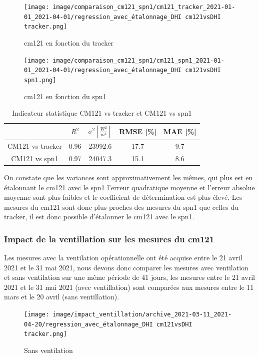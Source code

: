 \documentclass[12pt,a4paper]{article}
\begin{document}
\begin{flushleft}
\begin{figure}[H]
\centering
\texttt{[image: image/comparaison\_cm121\_spn1/cm121\_tracker\_2021-01-01\_2021-04-01/regression\_avec\_étalonnage\_DHI cm121vsDHI tracker.png]} 
\caption{cm121 en fonction du tracker}  
\end{figure}

\begin{figure}[H]
\centering
\texttt{[image: image/comparaison\_cm121\_spn1/cm121\_spn1\_2021-01-01\_2021-04-01/regression\_avec\_étalonnage\_DHI cm121vsDHI spn1.png]}  
\caption{cm121 en fonction du spn1}  
\end{figure}

\begin{table}[H]
\begin{center}
\begin{tabular}{ |c|c|c|c|c| } 
 \hline
  & $R^2$ & $\sigma ^2 [\frac{W^2}{m^4}]$ & RMSE [\%] & MAE [\%] \\ 
  \hline
 CM121 vs tracker & 0.96 & 23992.6 & 17.7 & 9.7\\ 
 \hline
 CM121 vs spn1 & 0.97 & 24047.3 & 15.1 & 8.6 \\ 
 \hline
\end{tabular}
\caption{Indicateur statistique CM121 vs tracker et CM121 vs spn1}
\end{center}
\end{table}


On constate que les variances sont approximativement les mêmes, qui plus est en étalonnant le cm121 avec le spn1 l'erreur quadratique moyenne et l'erreur absolue moyenne sont plus faibles et le coefficient de détermination est plus élevé. Les mesures du cm121 sont donc plus proches des mesures du spn1 que celles du tracker, il est donc possible d'étalonner le cm121 avec le spn1.  

\subsubsection{Impact de la ventillation sur les mesures du cm121}

Les mesures avec la ventilation opérationnelle ont été acquise entre le 21 avril 2021 et le 31 mai 2021, nous devons donc comparer les mesures avec ventilation et sans ventilation sur une même période de 41 jours, les mesures entre le 21 avril 2021 et le 31 mai 2021 (avec ventillation) sont comparées aux mesures entre le 11 mars et le 20 avril (sans ventillation).

\begin{figure}[H]
\centering
\texttt{[image: image/impact\_ventillation/archive\_2021-03-11\_2021-04-20/regression\_avec\_étalonnage\_DHI cm121vsDHI tracker.png]}  
\caption{Sans ventilation}  
\end{figure}


\end{flushleft}
\end{document}
